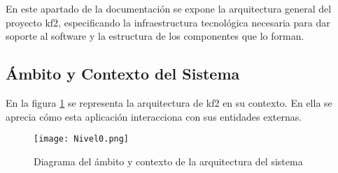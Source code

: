 


\section{} 

En este apartado de la documentación se expone la arquitectura general del proyecto \gls{kf2}, especificando la infraestructura tecnológica necesaria para dar soporte al software y la estructura de los componentes que lo forman.


\subsection{Ámbito y Contexto del Sistema}
En la figura \ref{image:level0} se representa la arquitectura de \gls{kf2} en su contexto. En ella se aprecia cómo esta aplicación interacciona con sus entidades externas.

\begin{figure}[H]
  \centering
     \texttt{[image: Nivel0.png]}
  \caption{Diagrama del ámbito y contexto de la arquitectura del sistema}
  \label{image:level0}
\end{figure}

\subsection{}

